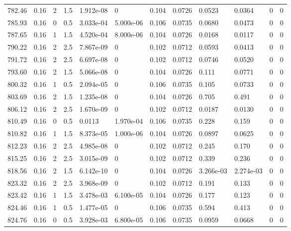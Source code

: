 \documentclass[preview]{standalone}
\begin{document}
{{{{{{\begin{tabular}{L{1.2cm}C{1.2cm} C{0.3cm}C{0.5cm} C{1.4cm}C{1.4cm} C{1.4cm}C{1.4cm} C{1.6cm}C{1.6cm} C{1.6cm}C{1.6cm}}
  782.46  &  0.16  & 2     & 1.5 &  1.912e-08  & 0  &  0.104&   0.0726& 0.0523 & 0.0364   &  0 & 0  \\ 
  785.93  &  0.16  & 0     & 0.5 &  3.033e-04  & 5.000e-06  &  0.106&   0.0735& 0.0680 & 0.0473   &  0 & 0  \\ 
  787.65  &  0.16  & 1     & 1.5 &  4.520e-04  & 8.000e-06  &  0.104&   0.0726& 0.0168 & 0.0117   &  0 & 0  \\ 
  790.22  &  0.16  & 2     & 2.5 &  7.867e-09  & 0  &  0.102&   0.0712& 0.0593 & 0.0413   &  0 & 0  \\ 
  791.72  &  0.16  & 2     & 2.5 &  6.697e-08  & 0  &  0.102&   0.0712& 0.0746 & 0.0520   &  0 & 0  \\ 
  793.60  &  0.16  & 2     & 1.5 &  5.066e-08  & 0  &  0.104&   0.0726& 0.111 & 0.0771   &  0 & 0  \\ 
  800.32  &  0.16  & 1     & 0.5 &  2.094e-05  & 0  &  0.106&   0.0735& 0.105 & 0.0733   &  0 & 0  \\ 
  803.69  &  0.16  & 2     & 1.5 &  1.235e-08  & 0  &  0.104&   0.0726& 0.705 & 0.491   &  0 & 0  \\ 
  806.12  &  0.16  & 2     & 2.5 &  1.670e-09  & 0  &  0.102&   0.0712& 0.0187 & 0.0130   &  0 & 0  \\ 
  810.49  &  0.16  & 0     & 0.5 &  0.0113  & 1.970e-04  &  0.106&   0.0735& 0.228 & 0.159   &  0 & 0  \\ 
  810.82  &  0.16  & 1     & 1.5 &  8.373e-05  & 1.000e-06  &  0.104&   0.0726& 0.0897 & 0.0625   &  0 & 0  \\ 
  812.23  &  0.16  & 2     & 2.5 &  4.985e-08  & 0  &  0.102&   0.0712& 0.245 & 0.170   &  0 & 0  \\ 
  815.25  &  0.16  & 2     & 2.5 &  3.015e-09  & 0  &  0.102&   0.0712& 0.339 & 0.236   &  0 & 0  \\ 
  818.56  &  0.16  & 2     & 1.5 &  6.142e-10  & 0  &  0.104&   0.0726& 3.266e-03 & 2.274e-03   &  0 & 0  \\ 
  823.32  &  0.16  & 2     & 2.5 &  3.968e-09  & 0  &  0.102&   0.0712& 0.191 & 0.133   &  0 & 0  \\ 
  823.42  &  0.16  & 1     & 1.5 &  3.478e-03  & 6.100e-05  &  0.104&   0.0726& 0.177 & 0.123   &  0 & 0  \\ 
  824.46  &  0.16  & 1     & 0.5 &  1.477e-05  & 0  &  0.106&   0.0735& 0.594 & 0.413   &  0 & 0  \\ 
  824.76  &  0.16  & 0     & 0.5 &  3.928e-03  & 6.800e-05  &  0.106&   0.0735& 0.0959 & 0.0668   &  0 & 0  \\ 

\end{tabular}}}}}}}
\end{document}
